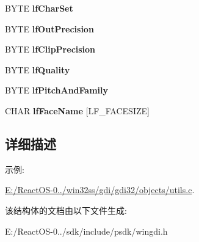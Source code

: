 \begin{DoxyCompactItemize}
B\+Y\+TE {\bfseries lf\+Char\+Set}
\item 
\mbox{\label{structtag_l_o_g_f_o_n_t_a_a71231f16e62d7a2285f516d61a45a3f2}} 
B\+Y\+TE {\bfseries lf\+Out\+Precision}
\item 
\mbox{\label{structtag_l_o_g_f_o_n_t_a_af226b853d3bf83929536361f970c2e31}} 
B\+Y\+TE {\bfseries lf\+Clip\+Precision}
\item 
\mbox{\label{structtag_l_o_g_f_o_n_t_a_a2a2f970fbfe56114f5e0d8ac678bae69}} 
B\+Y\+TE {\bfseries lf\+Quality}
\item 
\mbox{\label{structtag_l_o_g_f_o_n_t_a_ab3e080f497692d73ed8c9bfab8f6eaf7}} 
B\+Y\+TE {\bfseries lf\+Pitch\+And\+Family}
\item 
\mbox{\label{structtag_l_o_g_f_o_n_t_a_af08900612fba0f810dd080a3f8634181}} 
C\+H\+AR {\bfseries lf\+Face\+Name} \mbox{[}L\+F\+\_\+\+F\+A\+C\+E\+S\+I\+ZE\mbox{]}
\end{DoxyCompactItemize}


\subsection{详细描述}
\begin{Desc}
\item[示例\+: ]\par
\hyperlink{_e_1_2_react_o_s-0_84_86_2win32ss_2gdi_2gdi32_2objects_2utils_8c-example}{E\+:/\+React\+O\+S-\/0../win32ss/gdi/gdi32/objects/utils.\+c}.\end{Desc}


该结构体的文档由以下文件生成\+:\begin{DoxyCompactItemize}
\item 
E\+:/\+React\+O\+S-\/0../sdk/include/psdk/wingdi.\+h\end{DoxyCompactItemize}
